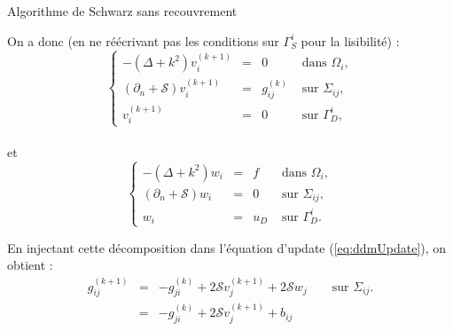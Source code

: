 \documentclass[
mode=present,    %
paper=a4paper,   %
orient=landscape,
display=slides,   %
size=10pt,
style=romain   %
]{powerdot}
\begin{document}
\begin{slide}[toc=]{Algorithme de Schwarz sans recouvrement}

\bigskip

On a donc (en ne réécrivant pas les conditions sur $\Gamma_S^i$ pour la
lisibilité) :
\[
\left\{\begin{array}{rcll}
-(\Delta + k^2) v_i^{(k+1)} & = & 0 & \text{ dans } \Omega_i,\\
(\partial_n + \mathcal{S}) v_i^{(k+1)} & = & g_{ij}^{(k)} & \text{ sur } \Sigma_{ij},\\
v_i^{(k+1)} & = & 0 & \text{ sur } \Gamma_{D}^i,
\end{array}\right.
\]\\
et
\[
\left\{\begin{array}{rcll}
-(\Delta + k^2) w_i & = & f & \text{ dans } \Omega_i,\\
(\partial_n + \mathcal{S}) w_i & = &  0 & \text{ sur } \Sigma_{ij},\\
w_i & = & u_D & \text{ sur } \Gamma_{D}^i.
\end{array}\right.
\]

\bigskip

En injectant cette décomposition dans l'équation d'update
(\ref{eq:ddmUpdate}), on obtient : %
\[
\begin{array}{rcl}
g_{ij}^{(k+1)} & = & -g_{ji}^{(k)} + 2 \mathcal{S}v_j^{(k+1)} + 2 \mathcal{S}w_j \quad \quad \text{sur } \Sigma_{ij}.\\
 & = & -g_{ji}^{(k)} + 2 \mathcal{S}v_j^{(k+1)} + b_{ij}
\end{array}
\]

\end{slide}
\end{document}
